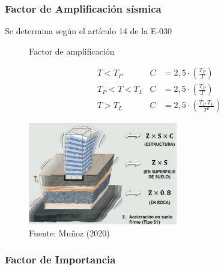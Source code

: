 \documentclass{article}%
\begin{document}
%
\subsubsection{Factor de Amplificación sísmica}%
\label{ssubsec:FactordeAmplificacinssmica}%
Se determina según el artículo 14 de la E{-}030%
\setlength{\jot}{0.5cm}%


\begin{figure}[h!]%
\caption{Factor de amplificación}%
\begin{minipage}{0.5\textwidth}%

    \begin{align*}
        &T< T_{P}         &   C&=2,5\cdot\left ( \frac{T_{P}}{T} \right )\\
        &T_{P}< T< T_{L}  &   C&=2,5\cdot\left ( \frac{T_{P}}{T} \right )\\
        &T> T_{L}         &   C&=2,5\cdot\left ( \frac{T_{P}\;T_{L}}{T^{2}} \right )
    \end{align*}%
\end{minipage}%
\begin{minipage}{0.4\textwidth}%
\centering%
\includegraphics[width=6.5cm]{images/Amplificacion}%
\end{minipage}%
\caption*{Fuente: Muñoz (2020)}%
\end{figure}

%
\subsubsection{Factor de Importancia}%
\label{ssubsec:FactordeImportancia}%
\end{document}
